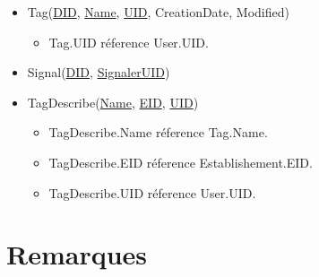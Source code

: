 \documentclass{article}
\begin{document}
\begin{itemize}
    \item Tag(\underline{DID}, \underline{Name}, \underline{UID}, CreationDate, Modified)

    \begin{itemize}
        \item Tag.UID réference User.UID.
    \end{itemize}

    \item Signal(\underline{DID}, \underline{SignalerUID})

    \item TagDescribe(\underline{Name}, \underline{EID}, \underline{UID})

    \begin{itemize}
        \item TagDescribe.Name réference Tag.Name.
        \item TagDescribe.EID réference Establishement.EID.
        \item TagDescribe.UID réference User.UID.
    \end{itemize}


\end{itemize}

\section*{Remarques}
\end{document}
